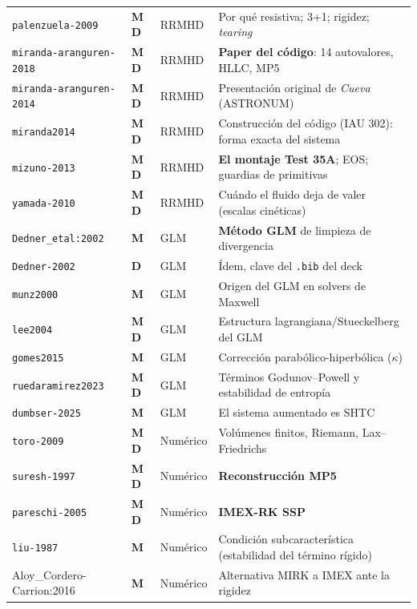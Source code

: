 \documentclass[11pt,openany]{report}
\newcommand{\clave}[1]{\texttt{\small #1}}
\newcommand{\Mono}{\textbf{\color{azulud}M}}
\newcommand{\Dia}{\textbf{\color{verdeok}D}}
\begin{document}
\begin{small}
\begin{longtable}{@{}p{} p{} p{} p{}@{}}
\clave{palenzuela-2009}     & \Mono\,\Dia      & RRMHD       & Por qué resistiva; 3+1; rigidez; \textit{tearing} \\
\clave{miranda-aranguren-2018} & \Mono\,\Dia   & RRMHD       & \textbf{Paper del código}: 14 autovalores, HLLC, MP5 \\
\clave{miranda-aranguren-2014} & \Mono\,\Dia   & RRMHD       & Presentación original de \textit{Cueva} (ASTRONUM) \\
\clave{miranda2014}         & \Mono\,\Dia      & RRMHD       & Construcción del código (IAU 302): forma exacta del sistema \\
\clave{mizuno-2013}         & \Mono\,\Dia      & RRMHD       & \textbf{El montaje Test 35A}; EOS; guardias de primitivas \\
\clave{yamada-2010}         & \Mono\,\Dia      & RRMHD       & Cuándo el fluido deja de valer (escalas cinéticas) \\
\midrule
\clave{Dedner\_etal:2002}    & \Mono            & GLM         & \textbf{Método GLM} de limpieza de divergencia \\
\clave{Dedner-2002}         & \Dia             & GLM         & Ídem, clave del \texttt{.bib} del deck \\
\clave{munz2000}            & \Mono            & GLM         & Origen del GLM en solvers de Maxwell \\
\clave{lee2004}             & \Mono\,\Dia      & GLM         & Estructura lagrangiana/Stueckelberg del GLM \\
\clave{gomes2015}           & \Mono            & GLM         & Corrección parabólico-hiperbólica ($\kappa$) \\
\clave{ruedaramirez2023}    & \Mono\,\Dia      & GLM         & Términos Godunov--Powell y estabilidad de entropía \\
\clave{dumbser-2025}        & \Mono            & GLM         & El sistema aumentado es SHTC \\
\midrule
\clave{toro-2009}           & \Mono\,\Dia      & Numérico    & Volúmenes finitos, Riemann, Lax--Friedrichs \\
\clave{suresh-1997}         & \Mono\,\Dia      & Numérico    & \textbf{Reconstrucción MP5} \\
\clave{pareschi-2005}       & \Mono\,\Dia      & Numérico    & \textbf{IMEX-RK SSP} \\
\clave{liu-1987}            & \Mono            & Numérico    & Condición subcaracterística (estabilidad del término rígido) \\
{\scriptsize\ttfamily Aloy\_Cordero-Carrion:2016} & \Mono & Numérico    & Alternativa MIRK a IMEX ante la rigidez \\

\end{longtable}
\end{small}
\end{document}
